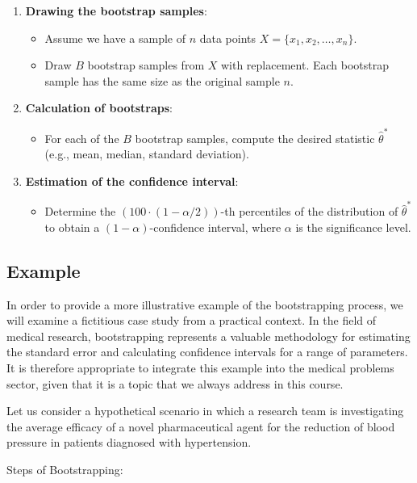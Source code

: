 \begin{enumerate}
    \item \textbf{Drawing the bootstrap samples}:
    \begin{itemize}
        \item Assume we have a sample of \( n \) data points \( X = \{x_1, x_2, \ldots, x_n\} \).
        \item Draw \( B \) bootstrap samples from \( X \) with replacement. Each bootstrap sample has the same size as the original sample \( n \).
    \end{itemize}
    
    \item \textbf{Calculation of bootstraps}:
    \begin{itemize}
        \item For each of the \( B \) bootstrap samples, compute the desired statistic \( \hat{\theta}^* \) (e.g., mean, median, standard deviation).
    \end{itemize}
    
    \item \textbf{Estimation of the confidence interval}:
    \begin{itemize}
        \item Determine the \( (100 \cdot (1 - \alpha/2)) \)-th percentiles of the distribution of \( \hat{\theta}^* \) to obtain a \( (1 - \alpha) \)-confidence interval, where \( \alpha \) is the significance level.
    \end{itemize}
\end{enumerate}

\subsection{Example}
In order to provide a more illustrative example of the bootstrapping process, we will examine a fictitious case study from a practical context. 
In the field of medical research, bootstrapping represents a valuable methodology for estimating the standard error and calculating confidence intervals for a range of parameters. It is therefore appropriate to integrate this example into the medical problems sector, given that it is a topic that we always address in this course.

Let us consider a hypothetical scenario in which a research team is investigating the average efficacy of a novel pharmaceutical agent for the reduction of blood pressure in patients diagnosed with hypertension.

Steps of Bootstrapping:

